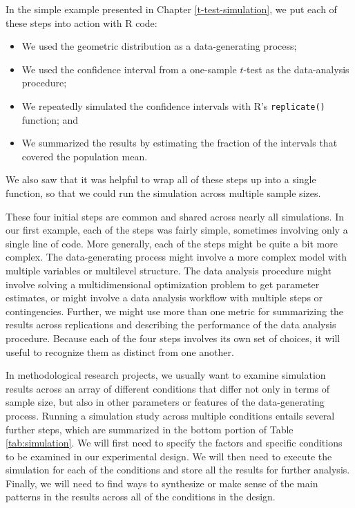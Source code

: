 \documentclass[
]{book}
\providecommand{\tightlist}{%
  \setlength{\itemsep}{0pt}\setlength{\parskip}{0pt}}
\begin{document}
In the simple example presented in Chapter \ref{t-test-simulation}, we put each of these steps into action with R code:

\begin{itemize}
\tightlist
\item
  We used the geometric distribution as a data-generating process;
\item
  We used the confidence interval from a one-sample \(t\)-test as the data-analysis procedure;
\item
  We repeatedly simulated the confidence intervals with R's \texttt{replicate()} function; and
\item
  We summarized the results by estimating the fraction of the intervals that covered the population mean.
\end{itemize}

We also saw that it was helpful to wrap all of these steps up into a single function, so that we could run the simulation across multiple sample sizes.

These four initial steps are common and shared across nearly all simulations.
In our first example, each of the steps was fairly simple, sometimes involving only a single line of code.
More generally, each of the steps might be quite a bit more complex. The data-generating process might involve a more complex model with multiple variables or multilevel structure.
The data analysis procedure might involve solving a multidimensional optimization problem to get parameter estimates, or might involve a data analysis workflow with multiple steps or contingencies.
Further, we might use more than one metric for summarizing the results across replications and describing the performance of the data analysis procedure.
Because each of the four steps involves its own set of choices, it will useful to recognize them as distinct from one another.

In methodological research projects, we usually want to examine simulation results across an array of different conditions that differ not only in terms of sample size, but also in other parameters or features of the data-generating process.
Running a simulation study across multiple conditions entails several further steps, which are summarized in the bottom portion of Table \ref{tab:simulation}. We will first need to specify the factors and specific conditions to be examined in our experimental design. We will then need to execute the simulation for each of the conditions and store all the results for further analysis. Finally, we will need to find ways to synthesize or make sense of the main patterns in the results across all of the conditions in the design.
\end{document}
